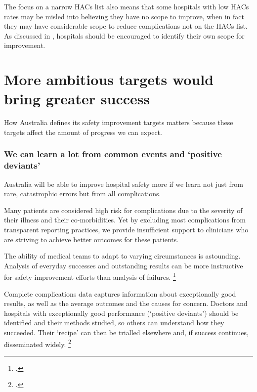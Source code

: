 \documentclass[FrontPage]{grattan}
\begin{document}
The focus on a narrow HACs list also means that some hospitals with low HACs rates may be misled into believing they have no scope to improve, when in fact they may have considerable scope to reduce complications not on the HACs list.
As discussed in , hospitals should be encouraged to identify their own scope for improvement.

\section{More ambitious targets would bring greater success }\label{sec:more-ambitious-targets-would-bring-greater-success}

How Australia defines its safety improvement targets matters because these targets affect the amount of progress we can expect.

\subsubsection{We can learn a lot from common events and `positive deviants'}\label{subsubsec:we-can-learn-a-lot-from-common-events-and-positive-deviants}

Australia will be able to improve hospital safety more if we learn not just from rare, catastrophic errors but from all complications.

Many patients are considered high risk for complications due to the severity of their illness and their co-morbidities.
Yet by excluding most complications from transparent reporting practices, we provide insufficient support to clinicians who are striving to achieve better outcomes for these patients.

The ability of medical teams to adapt to varying circumstances is astounding.
Analysis of everyday successes and outstanding results can be more instructive for safety improvement efforts than analysis of failures.%
	\footcite{Hollnagel-2014-Safety-Management}

Complete complications data captures information about exceptionally good results, as well as the average outcomes and the causes for concern.
Doctors and hospitals with exceptionally good performance (`positive deviants') should be identified and their methods studied, so others can understand how they succeeded.
Their `recipe' can then be trialled elsewhere and, if success continues, disseminated widely.%
	\footcites{lawton2014positive}{Baxterbmjqs-2015-004386}
\end{document}

